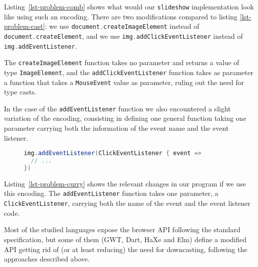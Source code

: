 \documentclass{llncs}
\newcommand{\jscode}[1]{\lstinline[language=JavaScript]|#1|}
\newcommand{\scalacode}[1]{\lstinline[language=Scala]|#1|}
\begin{document}
Listing~\ref{lst-problem-comb} shows what would our \scalacode{slideshow} implementation look like using such an encoding. There are two modifications compared to listing \ref{lst-problem-cast}: we use \scalacode{document.createImageElement} instead of \scalacode{document.createElement}, and we use \scalacode{img.addClickEventListener} instead of \scalacode{img.addEventListener}.

The \scalacode{createImageElement} function takes no parameter and returns a value of type \scalacode{ImageElement}, and the \scalacode{addClickEventListener} function takes as parameter a function that takes a \scalacode{MouseEvent} value as parameter, ruling out the need for type casts.

In the case of the \jscode{addEventListener} function we also encountered a slight variation of the encoding, consisting in defining one general function taking one parameter carrying both the 
information of the event name and the event listener.

\begin{figure}
\begin{lstlisting}[label=lst-problem-curry,language=Scala,caption={Implementation of \texttt{slideshow} using a general \texttt{addEventListener} function taking one parameter containing both the event name and the even listener}]
img.addEventListener(ClickEventListener { event =>
  // ...
})
\end{lstlisting}
\end{figure}

Listing~\ref{lst-problem-curry} shows the relevant changes in our program if we use this encoding. The \scalacode{addEventListener} function takes one parameter, a \scalacode{ClickEventListener}, carrying both the name of the event and the event listener code.

Most of the studied languages expose the browser API following the standard specification, but some of them (GWT, Dart, HaXe and Elm) define a modified API getting rid of (or at least reducing) the need for downcasting, following the approaches described above.
\end{document}
